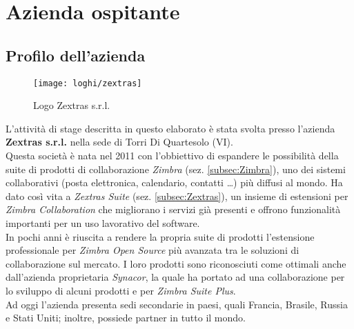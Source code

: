 \chapter{Azienda ospitante}\label{chap:company}

\section{Profilo dell'azienda}
\begin{figure}[H] 
	\centering
	\texttt{[image: loghi/zextras]}
	\caption{Logo Zextras s.r.l.}
	\label{fig:logoZextras}
\end{figure}
L'attività di stage descritta in questo elaborato è stata svolta presso l'azienda \textbf{Zextras s.r.l.} nella sede di Torri Di Quartesolo (VI). \\
Questa società è nata nel 2011 con l'obbiettivo di espandere le possibilità della suite di prodotti di collaborazione \emph{Zimbra} (sez. \ref{subsec:Zimbra}), uno dei sistemi collaborativi (posta elettronica, calendario, contatti …) più diffusi al mondo. Ha dato così vita a \emph{Zextras Suite} (sez. \ref{subsec:Zextras}), un insieme di estensioni per \emph{Zimbra Collaboration} che migliorano i servizi già presenti e offrono funzionalità importanti per un uso lavorativo del software.\\
In pochi anni è riuscita a rendere la propria suite di prodotti l'estensione professionale per \emph{Zimbra Open Source} più avanzata tra le soluzioni di collaborazione sul mercato. I loro prodotti sono riconosciuti come ottimali anche dall'azienda proprietaria \emph{Synacor}, la quale ha portato ad una collaborazione per lo sviluppo di alcuni prodotti  e per \emph{Zimbra Suite Plus}.\\
Ad oggi l'azienda presenta sedi secondarie in paesi, quali Francia, Brasile, Russia e Stati Uniti;  inoltre, possiede partner in tutto il mondo.\\


